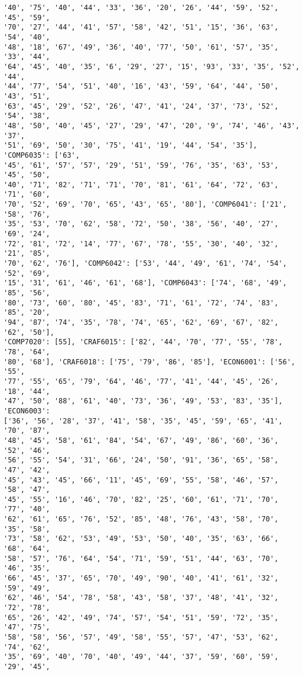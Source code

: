 \documentclass[11pt]{article}
\begin{document}
\begin{Verbatim}[commandchars=\\\{\}]
'40', '75', '40', '44', '33', '36', '20', '26', '44', '59', '52', '45', '59',
'70', '27', '44', '41', '57', '58', '42', '51', '15', '36', '63', '54', '40',
'48', '18', '67', '49', '36', '40', '77', '50', '61', '57', '35', '33', '44',
'64', '45', '40', '35', '6', '29', '27', '15', '93', '33', '35', '52', '44',
'44', '77', '54', '51', '40', '16', '43', '59', '64', '44', '50', '43', '51',
'63', '45', '29', '52', '26', '47', '41', '24', '37', '73', '52', '54', '38',
'48', '50', '40', '45', '27', '29', '47', '20', '9', '74', '46', '43', '37',
'51', '69', '50', '30', '75', '41', '19', '44', '54', '35'], 'COMP6035': ['63',
'45', '61', '57', '57', '29', '51', '59', '76', '35', '63', '53', '45', '50',
'40', '71', '82', '71', '71', '70', '81', '61', '64', '72', '63', '71', '60',
'70', '52', '69', '70', '65', '43', '65', '80'], 'COMP6041': ['21', '58', '76',
'35', '53', '70', '62', '58', '72', '50', '38', '56', '40', '27', '69', '24',
'72', '81', '72', '14', '77', '67', '78', '55', '30', '40', '32', '21', '85',
'70', '62', '76'], 'COMP6042': ['53', '44', '49', '61', '74', '54', '52', '69',
'15', '31', '61', '46', '61', '68'], 'COMP6043': ['74', '68', '49', '85', '56',
'80', '73', '60', '80', '45', '83', '71', '61', '72', '74', '83', '85', '20',
'94', '87', '74', '35', '78', '74', '65', '62', '69', '67', '82', '62', '50'],
'COMP7020': [55], 'CRAF6015': ['82', '44', '70', '77', '55', '78', '78', '64',
'80', '68'], 'CRAF6018': ['75', '79', '86', '85'], 'ECON6001': ['56', '55',
'77', '55', '65', '79', '64', '46', '77', '41', '44', '45', '26', '18', '44',
'47', '50', '88', '61', '40', '73', '36', '49', '53', '83', '35'], 'ECON6003':
['36', '56', '28', '37', '41', '58', '35', '45', '59', '65', '41', '70', '87',
'48', '45', '58', '61', '84', '54', '67', '49', '86', '60', '36', '52', '46',
'56', '55', '54', '31', '66', '24', '50', '91', '36', '65', '58', '47', '42',
'45', '43', '45', '66', '11', '45', '69', '55', '58', '46', '57', '58', '47',
'45', '55', '16', '46', '70', '82', '25', '60', '61', '71', '70', '77', '40',
'62', '61', '65', '76', '52', '85', '48', '76', '43', '58', '70', '35', '58',
'73', '58', '62', '53', '49', '53', '50', '40', '35', '63', '66', '68', '64',
'58', '57', '76', '64', '54', '71', '59', '51', '44', '63', '70', '46', '35',
'66', '45', '37', '65', '70', '49', '90', '40', '41', '61', '32', '59', '49',
'62', '46', '54', '78', '58', '43', '58', '37', '48', '41', '32', '72', '78',
'65', '26', '42', '49', '74', '57', '54', '51', '59', '72', '35', '47', '75',
'58', '58', '56', '57', '49', '58', '55', '57', '47', '53', '62', '74', '62',
'35', '69', '40', '70', '40', '49', '44', '37', '59', '60', '59', '29', '45',

\end{Verbatim}
\end{document}
